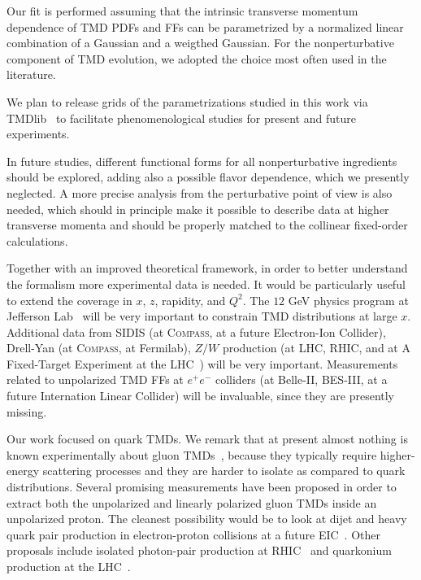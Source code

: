 \documentclass[aps,preprintnumbers,showpacs,nofootinbib,superscriptaddress,floatfix]{revtex4}
\newcommand{\compass}{\textsc{Compass}}
\begin{document}
Our fit is performed assuming that the intrinsic transverse momentum
dependence of TMD PDFs and FFs 
can be parametrized by a normalized linear combination of a Gaussian and a
weigthed Gaussian. 
For the nonperturbative component of TMD evolution, we adopted the choice most
often used in the literature. 

We plan to release grids of the parametrizations studied in this work via
TMDlib~\cite{Hautmann:2014kza} to facilitate phenomenological studies for
present and future experiments. 

In future studies, different
functional forms for all nonperturbative ingredients should be explored, 
adding also a possible
flavor dependence, which we presently neglected.
A more
precise analysis from the perturbative point of view is also needed, which
should in principle make it possible to describe data at higher transverse
momenta and 
should be properly matched to 
the collinear fixed-order calculations. 

Together with an improved theoretical framework, in order to better understand
the formalism more experimental data is needed. It would be particularly
useful to extend the
coverage in $x$, $z$, rapidity, and $Q^2$.  
The $12$ GeV physics program at Jefferson Lab~\cite{Dudek:2012vr} will be very important to constrain TMD distributions at large $x$.
Additional data from SIDIS (at \compass, at a future Electron-Ion
Collider), Drell-Yan (at \compass, at Fermilab), 
$Z/W$ production (at LHC, RHIC, and at
A Fixed-Target Experiment at the LHC~\cite{Brodsky:2012vg}) 
will be very important. Measurements
related to unpolarized
TMD FFs at $e^+e^-$ colliders (at Belle-II, BES-III, at a
future Internation Linear Collider) will be invaluable, since they are
presently missing.

Our work focused on quark TMDs.
We remark that at present almost nothing is known experimentally about gluon
TMDs~\cite{Mulders:2000sh,Echevarria:2015uaa}, because they typically require
higher-energy scattering processes and they are harder to isolate as compared
to quark distributions. Several promising measurements have been proposed in
order to extract both the unpolarized and linearly polarized gluon TMDs inside
an unpolarized proton. The cleanest possibility would be to look at dijet and
heavy quark pair production in electron-proton collisions at a future
EIC~\cite{Boer:2010zf,Pisano:2013cya}. Other proposals include isolated
photon-pair production at RHIC~\cite{Qiu:2011ai} and quarkonium production at
the LHC~\cite{Boer:2012bt,Dunnen:2014eta,Lansberg:2017tlc}.   
\end{document}
